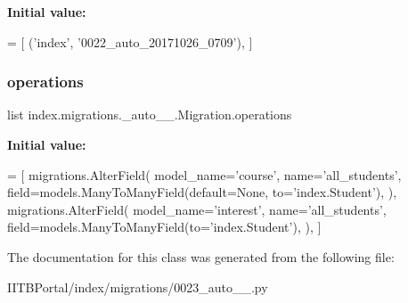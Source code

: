 {\bfseries Initial value\+:}
\begin{DoxyCode}
=  [
        (\textcolor{stringliteral}{'index'}, \textcolor{stringliteral}{'0022\_auto\_20171026\_0709'}),
    ]
\end{DoxyCode}
\mbox{\label{classindex_1_1migrations_1_10023__auto__20171026__0756_1_1Migration_a802442223b51190d853b261bce6e7708}} 
\subsubsection{\texorpdfstring{operations}{operations}}
{\footnotesize\ttfamily list index.\+migrations.\+\_\+auto\+\_\+\_.\+Migration.\+operations\hspace{0.3cm}{\ttfamily [static]}}

{\bfseries Initial value\+:}
\begin{DoxyCode}
=  [
        migrations.AlterField(
            model\_name=\textcolor{stringliteral}{'course'},
            name=\textcolor{stringliteral}{'all\_students'},
            field=models.ManyToManyField(default=\textcolor{keywordtype}{None}, to=\textcolor{stringliteral}{'index.Student'}),
        ),
        migrations.AlterField(
            model\_name=\textcolor{stringliteral}{'interest'},
            name=\textcolor{stringliteral}{'all\_students'},
            field=models.ManyToManyField(to=\textcolor{stringliteral}{'index.Student'}),
        ),
    ]
\end{DoxyCode}


The documentation for this class was generated from the following file\+:\begin{DoxyCompactItemize}
\item 
I\+I\+T\+B\+Portal/index/migrations/0023\+\_\+auto\+\_\+\_.\+py\end{DoxyCompactItemize}
